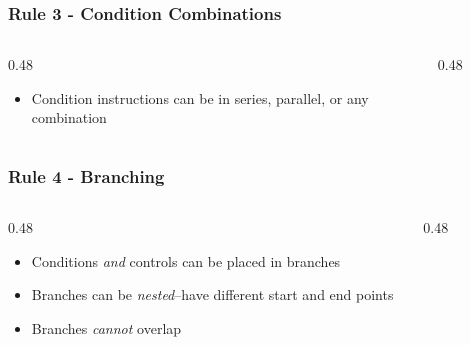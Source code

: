 \begin{frame}
    \frametitle{Rule 3 - Condition Combinations}

    \begin{columns}
        \begin{column}{0.48\linewidth}
            \begin{itemize}
                \item Condition instructions can be in series, parallel, or any combination
            \end{itemize}
        \end{column}
        \begin{column}{0.48\linewidth}
            \begin{figure}
                \centering
                \resizebox{\linewidth}{!}{
                    
                }
            \end{figure}
        \end{column}
    \end{columns}
\end{frame}

\begin{frame}
    \frametitle{Rule 4 - Branching}

    \begin{columns}
        \begin{column}{0.48\linewidth}
            \begin{itemize}
                \item Conditions \emph{and} controls can be placed in branches
                \item Branches can be \emph{nested}--have different start and end points
                \item Branches \emph{cannot} overlap
            \end{itemize}
        \end{column}
        \begin{column}{0.48\linewidth}
            \begin{figure}
                \centering
                \resizebox{\linewidth}{!}{
                    
                }
            \end{figure}
        \end{column}
    \end{columns}
\end{frame}

